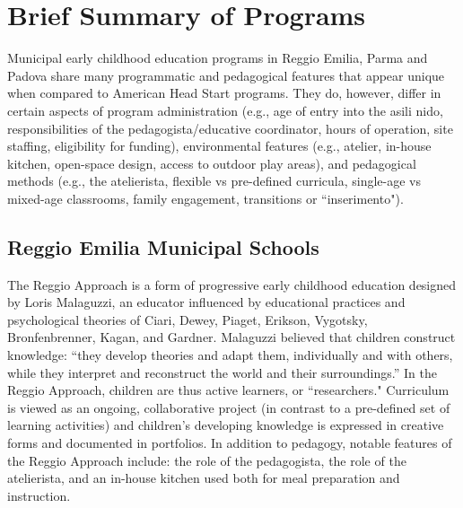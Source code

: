 \documentclass[11pt]{article}
\begin{document}
\section{Brief Summary of Programs}

Municipal early childhood education programs in Reggio Emilia, Parma and Padova share many programmatic and pedagogical features that appear unique when compared to American Head Start programs. They do, however, differ in certain aspects of program administration (e.g., age of entry into the asili nido, responsibilities of the pedagogista/educative coordinator, hours of operation, site staffing, eligibility for funding), environmental features (e.g., atelier, in-house kitchen, open-space design, access to outdoor play areas), and pedagogical methods (e.g., the atelierista, flexible vs pre-defined curricula, single-age vs mixed-age classrooms, family engagement, transitions or ``inserimento"). 

\subsection{Reggio Emilia Municipal Schools}

The Reggio Approach is a form of progressive early childhood education designed by Loris Malaguzzi, an educator influenced by educational practices and psychological theories of Ciari, Dewey, Piaget, Erikson, Vygotsky, Bronfenbrenner, Kagan, and Gardner. Malaguzzi believed that children construct knowledge: ``they develop theories and adapt them, individually and with others, while they interpret and reconstruct the world and their surroundings.'' In the Reggio Approach, children are thus active learners, or ``researchers." Curriculum is viewed as an ongoing, collaborative project (in contrast to a pre-defined set of learning activities) and children's developing knowledge is expressed in creative forms and documented in portfolios. In addition to pedagogy, notable features of the Reggio Approach include: the role of the pedagogista, the role of the atelierista, and an in-house kitchen used both for meal preparation and instruction. 

\end{document}
